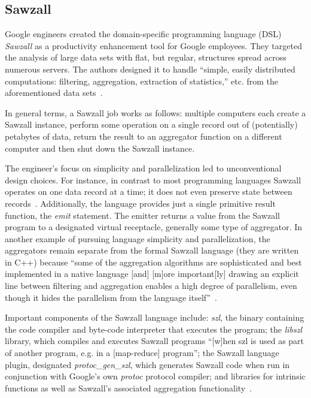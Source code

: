 \pv 

\subsection{Sawzall}

Google engineers created the domain-specific programming language
(DSL) \textit{Sawzall} as a productivity enhancement tool for Google
employees.  They targeted the analysis of large data sets with flat,
but regular, structures spread across numerous servers.  The authors
designed it to handle ``simple, easily distributed computations:
filtering, aggregation, extraction of statistics,'' etc. from the
aforementioned data sets~\cite{pike05sawzall}.

     In general terms, a Sawzall job works as follows: multiple
     computers each create a Sawzall instance, perform some operation
     on a single record out of (potentially) petabytes of data, return
     the result to an aggregator function on a different computer and
     then shut down the Sawzall instance.

     The engineer's focus on simplicity and parallelization led to
     unconventional design choices.  For instance, in contrast to most
     programming languages Sawzall operates on one data record at a
     time; it does not even preserve state between
     records~\cite{www-bytemining-sawzall}. Additionally, the language
     provides just a single primitive result function, the \textit{emit}
     statement.  The emitter returns a value from the Sawzall program
     to a designated virtual receptacle, generally some type of
     aggregator.  In another example of pursuing language simplicity
     and parallelization, the aggregators remain separate from the
     formal Sawzall language (they are written in C++) because ``some
     of the aggregation algorithms are sophisticated and best
     implemented in a native language [and] [m]ore important[ly]
     drawing an explicit line between filtering and aggregation
     enables a high degree of parallelism, even though it hides the
     parallelism from the language itself''~\cite{pike05sawzall}.

     Important components of the Sawzall language include: \textit{szl}, the
     binary containing the code compiler and byte-code interpreter
     that executes the program; the \textit{libszl} library, which compiles
     and executes Sawzall programs ``[w]hen szl is used as part of
     another program, e.g. in a [map-reduce] program''; the Sawzall
     language plugin, designated \textit{protoc\_gen\_szl}, which generates
     Sawzall code when run in conjunction with Google's own \textit{protoc}
     protocol compiler; and libraries for intrinsic functions as well
     as Sawzall's associated aggregation
     functionality~\cite{www-google-code-wiki-sawzall}.

